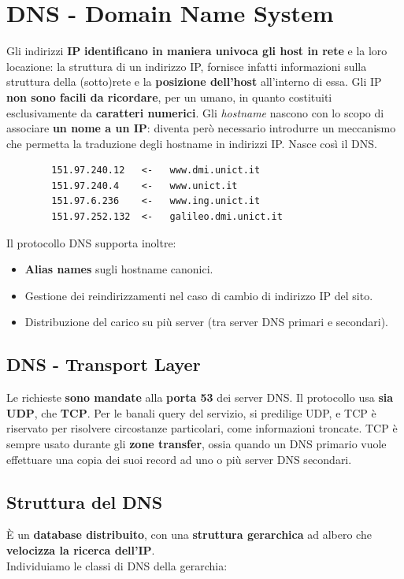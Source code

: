 \section{DNS - Domain Name System}
Gli indirizzi \textbf{IP} \textbf{identificano in maniera univoca gli host in rete} e la loro locazione: la struttura di un indirizzo IP, fornisce infatti informazioni sulla struttura della (sotto)rete e la \textbf{posizione dell'host} all'interno di essa. 
Gli IP \textbf{non sono facili da ricordare}, per un umano, in quanto costituiti esclusivamente da \textbf{caratteri numerici}. Gli \textit{hostname} nascono con lo scopo di associare \textbf{un nome a un IP}: diventa però necessario introdurre un meccanismo che permetta la traduzione degli hostname in indirizzi IP. Nasce così il DNS.
\begin{verbatim}
        151.97.240.12   <-   www.dmi.unict.it
        151.97.240.4    <-   www.unict.it
        151.97.6.236    <-   www.ing.unict.it
        151.97.252.132  <-   galileo.dmi.unict.it
\end{verbatim}

Il protocollo DNS supporta inoltre:
\begin{itemize}
    \item \textbf{Alias names} sugli hostname canonici. 
    \item Gestione dei reindirizzamenti nel caso di cambio di indirizzo IP del sito.
    \item Distribuzione del carico su più server (tra server DNS primari e secondari).
\end{itemize}

\subsection{DNS - Transport Layer}
Le richieste \textbf{sono mandate} alla \textbf{porta 53} dei server DNS. Il protocollo usa \textbf{sia UDP}, che \textbf{TCP}. Per le banali query del servizio, si predilige UDP, e TCP è riservato per risolvere circostanze particolari, come informazioni troncate.
TCP è sempre usato durante gli \textbf{zone transfer}, ossia quando un DNS primario vuole effettuare una copia dei suoi record ad uno o più server DNS secondari.

\subsection{Struttura del DNS}
È un \textbf{database distribuito}, con una \textbf{struttura gerarchica} ad albero che \textbf{velocizza la ricerca dell'IP}.\\
Individuiamo le classi di DNS della gerarchia:

